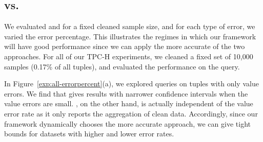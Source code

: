 


\subsection{\sampleclean vs. \bias}
We evaluated \sampleclean and \bias for a fixed cleaned sample size, and for each type of error, we varied the error percentage.
This illustrates the regimes in which our framework will have good performance since we can apply the more accurate of the two approaches.
For all of our TPC-H experiments, we cleaned a fixed set of 10,000 samples (0.17\% of all tuples), and evaluated the performance on the \avgfunc query. 





In Figure~\ref{exp:all-errorpercent}(a), we explored \avgfunc queries on tuples with only value errors.
We find that \bias gives results with narrower confidence intervals when the value errors are small.
\sampleclean, on the other hand, is actually independent of the value error rate as it only reports the aggregation of clean data.
Accordingly, since our framework dynamically chooses the more accurate approach, we can give tight bounds for datasets with higher and lower error rates.

